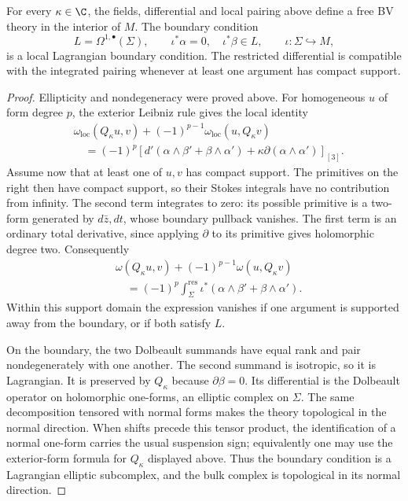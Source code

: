 \begin{proposition}
\label{prop:bf-bv-family}
For every $\kappa\in\C$, the fields, differential and local pairing above
define a free BV theory in the interior of $M$.  The boundary condition
\[
 L=\Omega^{1,\bullet}(\Sigma),\qquad
 \iota^*\alpha=0,\quad \iota^*\beta\in L,
 \qquad \iota:\Sigma\hookrightarrow M,
\]
is a local Lagrangian boundary condition.  The restricted differential
is compatible with the integrated pairing whenever at least one
argument has compact support.
\end{proposition}
\begin{proof}
Ellipticity and nondegeneracy were proved above.  For homogeneous $u$
of form degree $p$, the exterior Leibniz rule gives the local identity
\[
 \begin{split}
 &\omega_{\mathrm{loc}}(Q_\kappa u,v)
              +(-1)^{p-1}\omega_{\mathrm{loc}}(u,Q_\kappa v)\\
 &\quad=(-1)^p\left[d'(\alpha\wedge\beta'+\beta\wedge\alpha')
                  +\kappa\partial(\alpha\wedge\alpha')\right]_{[3]}.
 \end{split}
\]
Assume now that at least one of $u,v$ has compact support.  The
primitives on the right then have compact support, so their Stokes
integrals have no contribution from infinity.  The second term
integrates to zero: its possible primitive is a two-form generated
by $d\bar z,dt$, whose boundary pullback vanishes.  The first term is
an ordinary total derivative, since applying $\partial$ to its
primitive gives holomorphic degree two.  Consequently
\[
 \begin{split}
 &\omega(Q_\kappa u,v)+(-1)^{p-1}\omega(u,Q_\kappa v)\\
 &\quad=(-1)^p\int_\Sigma^{\mathrm{res}}
    \iota^*(\alpha\wedge\beta'+\beta\wedge\alpha').
 \end{split}
\]
Within this support domain the expression vanishes if one argument
is supported away from the boundary, or if both satisfy $L$.

On the boundary, the two Dolbeault summands have equal rank and pair
nondegenerately with one another.  The second summand is isotropic,
so it is Lagrangian.  It is preserved by $Q_\kappa$ because
$\partial\beta=0$.  Its differential is the Dolbeault operator on
holomorphic one-forms, an elliptic complex on $\Sigma$.
The same decomposition tensored with normal forms makes the theory
topological in the normal direction.  When shifts precede this tensor
product, the identification of a normal one-form carries the usual
suspension sign; equivalently one may use the exterior-form formula
for $Q_\kappa$ displayed above.  Thus the boundary condition is a Lagrangian elliptic subcomplex,
and the bulk complex is topological in its normal direction.
\end{proof}

